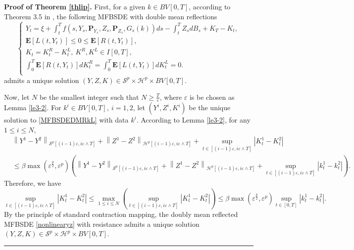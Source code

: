 \documentclass[10pt]{article}%
\numberwithin{equation}{section}
\newenvironment{proof}[1][Proof]{\noindent \textbf{#1.} }{\  \rule{0.5em}{0.5em}}
\begin{document}
\begin{proof}[Proof of Theorem \ref{thlip}] First, for a given $k\in BV[0,T]$, according to Theorem 3.5 in \cite{LS},  the following MFBSDE with double mean reflections
 \begin{equation}\label{MFBSDEDMRkL}
\begin{cases}
Y_t=\xi+\int_t^T f(s,Y_s,\mathbf{P}_{Y_s},Z_s,\mathbf{P}_{Z_s},G_s(k))ds-\int_t^T Z_s dB_s+K_T-K_t, \\
\mathbf{E}[L(t,Y_t)]\leq 0\leq \mathbf{E}[R(t,Y_t)], \\
K_t=K^R_t-K^L_t,\ K^R,K^L\in I[0,T],\\
\int_0^T \mathbf{E}[R(t,Y_t)]dK_t^R=\int_0^T \mathbf{E}[L(t,Y_t)]dK^L_t=0.\\
\end{cases}
\end{equation}
admits a unique solution $(Y,Z,K)\in\mathcal{S}^p \times \mathcal{H}^{p} \times BV[0,T]$. 

Now, let $N$ be the smallest integer such that $N\geq \frac{T}{\varepsilon}$, where $\varepsilon$ is be chosen as Lemma \ref{le3-2}. For $k^i\in BV[0,T],\ i=1,2$, let $(Y^i,Z^i,K^i)$ be the unique solution to \eqref{MFBSDEDMRkL} with data $k^i$. According to Lemma \ref{le3-2}, for any $1\leq i\leq N$, 
$$
\begin{aligned}
  &\left\|Y^{1}-Y^{2}\right\|_{\mathcal{S}^{p}{[(i-1)\varepsilon,i\varepsilon \wedge T]}}+\left\|Z^{1}-Z^{2}\right\|_{\mathcal{H}^{p}[(i-1)\varepsilon,i\varepsilon \wedge T]}+\sup_{t\in[(i-1)\varepsilon,i\varepsilon \wedge T]}\left|K_{t}^{1}-K_{t}^{2}\right|\\
  &\leq \beta\max\left(\varepsilon^{\frac{p}{2}},\varepsilon^p\right) \left(\left\|Y^{1}-Y^{2}\right\|_{\mathcal{S}^{p}[(i-1)\varepsilon,i\varepsilon \wedge T]}+\left\|Z^{1}-Z^{2}\right\|_{\mathcal{H}^{p}[(i-1)\varepsilon,i\varepsilon \wedge T]}+\sup_{t\in[(i-1)\varepsilon,i\varepsilon \wedge T]}\left|k_t^1-k_t^2\right|\right).
\end{aligned}
$$
Therefore, we have 
$$\sup_{t\in[(i-1)\varepsilon,i\varepsilon \wedge T]}\left|K_t^1-K_t^2\right|\leq \max_{1\leq i \leq N}\left(\sup_{t\in[(i-1)\varepsilon,i\varepsilon \wedge T]}\left|K_t^1-K_t^2\right|\right)\leq \beta\max\left(\varepsilon^{\frac{p}{2}},\varepsilon^p\right)\sup_{t\in[0,T]}\left|k_t^1-k_t^2\right|.$$
By the principle of standard contraction mapping, the doubly mean reflected MFBSDE \eqref{nonlinearyz} with resistance  admits a unique solution $(Y,Z,K)\in\mathcal{S}^p \times \mathcal{H}^{p} \times BV[0,T].$   
\end{proof}
\end{document}
